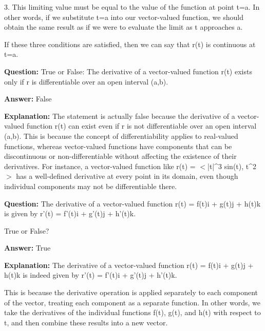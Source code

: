 \documentclass{article}
\begin{document}
3. This limiting value must be equal to the value of the function at point t=a. In other words, if we substitute t=a into our vector-valued function, we should obtain the same result as if we were to evaluate the limit as t approaches a.

If these three conditions are satisfied, then we can say that r(t) is continuous at t=a.
                
                \vspace{0.5cm} 
        
            
                \textbf {Question:} True or False: The derivative of a vector-valued function r(t) exists only if r is differentiable over an open interval (a,b).
                
                \textbf{Answer:} False

                \textbf{Explanation:} The statement is actually false because the derivative of a vector-valued function r(t) can exist even if r is not differentiable over an open interval (a,b). This is because the concept of differentiability applies to real-valued functions, whereas vector-valued functions have components that can be discontinuous or non-differentiable without affecting the existence of their derivatives. For instance, a vector-valued function like r(t) = \ensuremath{<}|t|{\textasciicircum}3 sin(t), t{\textasciicircum}2\ensuremath{>} has a well-defined derivative at every point in its domain, even though individual components may not be differentiable there.
                
                \vspace{0.5cm} 
        
            
                \textbf {Question:} The derivative of a vector-valued function r(t) = f(t)i + g(t)j + h(t)k is given by r'(t) = f'(t)i + g'(t)j + h'(t)k.

True or False?
                
                \textbf{Answer:} True

                \textbf{Explanation:} The derivative of a vector-valued function r(t) = f(t)i + g(t)j + h(t)k is indeed given by r'(t) = f'(t)i + g'(t)j + h'(t)k.

This is because the derivative operation is applied separately to each component of the vector, treating each component as a separate function. In other words, we take the derivatives of the individual functions f(t), g(t), and h(t) with respect to t, and then combine these results into a new vector.
\end{document}

